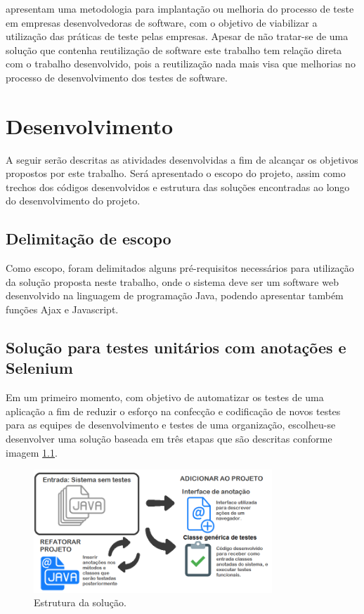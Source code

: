 \documentclass[tg]{mdtufsm}
\begin{document}
\cite{crespo2004metodologia} apresentam uma metodologia para implantação ou melhoria do processo de teste em empresas desenvolvedoras de software, com o objetivo de viabilizar a utilização das práticas de teste pelas empresas. Apesar de não tratar-se de uma solução que contenha reutilização de software este trabalho tem relação direta com o trabalho desenvolvido, pois a reutilização nada mais visa que melhorias no processo de desenvolvimento dos testes de software.

\chapter{Desenvolvimento}

A seguir serão descritas as atividades desenvolvidas a fim de alcançar os objetivos propostos por este trabalho. Será apresentado o escopo do projeto, assim como trechos dos códigos desenvolvidos e estrutura das soluções encontradas ao longo do desenvolvimento do projeto.

\section{Delimitação de escopo}

Como escopo, foram delimitados alguns pré-requisitos necessários para utilização da solução proposta neste trabalho, onde o sistema deve ser um software web desenvolvido na linguagem de programação Java,
podendo apresentar também funções Ajax e Javascript.

\section{Solução para testes unitários com anotações e Selenium}
Em um primeiro momento, com objetivo de automatizar os testes de uma aplicação a fim de reduzir o esforço na confecção e codificação de novos testes para as equipes de desenvolvimento e testes de uma organização,
escolheu-se desenvolver uma solução baseada em três etapas que são descritas conforme imagem \ref{fig:solucao1}.

\begin{figure}[!htb]
	\centering
	\includegraphics[width=0.8\textwidth]{solucao1}
	\caption{Estrutura da solução.}
	\label{fig:solucao1}
\end{figure}
\end{document}
